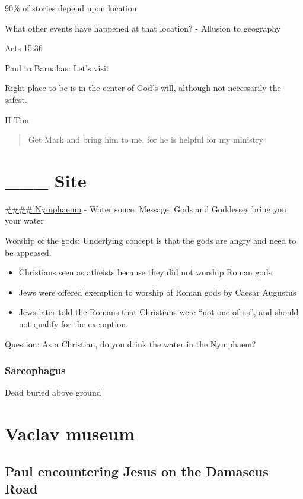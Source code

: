 \documentclass[
]{book}
\providecommand{\tightlist}{%
  \setlength{\itemsep}{0pt}\setlength{\parskip}{0pt}}
\begin{document}
90\% of stories depend upon location

What other events have happened at that location? - Allusion to geography

Acts 15:36

Paul to Barnabas: Let's visit

Right place to be is in the center of God's will, although not necessarily the safest.

II Tim

\begin{quote}
Get Mark and bring him to me, for he is helpful for my ministry
\end{quote}

\hypertarget{site}{%
\chapter{\_\_\_ Site}\label{site}}

\href{https://en.wikipedia.org/wiki/Nymphaeum}{\#\#\#\# Nymphaeum} - Water souce. Message: Gods and Goddesses bring you your water

Worship of the gods: Underlying concept is that the gods are angry and need to be appeased.

\begin{itemize}
\tightlist
\item
  Christians seen as atheists because they did not worship Roman gods
\item
  Jews were offered exemption to worship of Roman gods by Caesar Augustus
\item
  Jews later told the Romans that Christians were ``not one of us'', and should not qualify for the exemption.
\end{itemize}

Question: As a Christian, do you drink the water in the Nymphaem?

\hypertarget{sarcophagus}{%
\subsection{Sarcophagus}\label{sarcophagus}}

Dead buried above ground

\hypertarget{vaclav-museum}{%
\chapter{Vaclav museum}\label{vaclav-museum}}

\hypertarget{paul-encountering-jesus-on-the-damascus-road}{%
\section{Paul encountering Jesus on the Damascus Road}\label{paul-encountering-jesus-on-the-damascus-road}}
\end{document}
